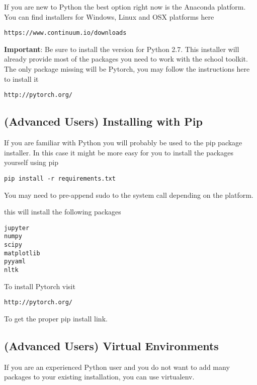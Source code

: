 If you are new to Python the best option right now is the Anaconda platform. You can find installers for Windows, Linux and OSX platforms here

\begin{verbatim}
https://www.continuum.io/downloads
\end{verbatim}

\textbf{Important}: Be sure to install the version for Python 2.7. This installer will already provide most of the packages you need to work with the school toolkit. The only package missing will be Pytorch, you may follow the instructions here to install it

\begin{verbatim}
http://pytorch.org/
\end{verbatim}

\subsection{(Advanced Users) Installing with Pip}

If you are familiar with Python you will probably be used to the pip package installer. In this case it might be more easy for you to install the packages yourself using pip

\begin{verbatim}
pip install -r requirements.txt 
\end{verbatim}

You may need to pre-append sudo to the system call depending on the platform.

\noindent this will install the following packages

\begin{verbatim}
jupyter
numpy
scipy
matplotlib
pyyaml
nltk
\end{verbatim}

\noindent To install Pytorch visit 

\begin{verbatim}
http://pytorch.org/
\end{verbatim}

\noindent To get the proper pip install link.

\subsection{(Advanced Users) Virtual Environments}

If you are an experienced Python user and you do not want to add many packages to your existing installation, you can use virtualenv.

